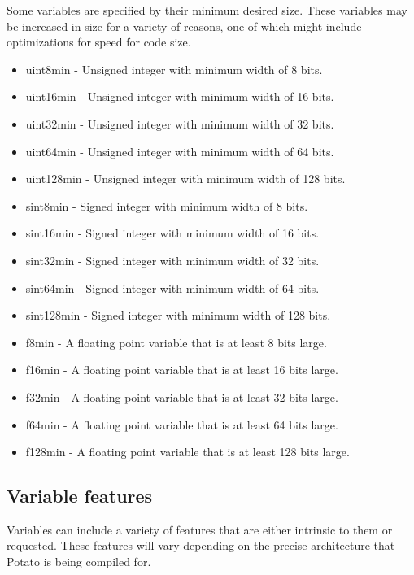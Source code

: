 \documentclass[12pt]{article}
\newcommand{\progLangNameSpace}{Potato }
\begin{document}
Some variables are specified by their minimum desired size. These variables may be increased in size for a variety of reasons, one of which might include optimizations for speed for code size.

\begin{itemize}
\item uint8min - Unsigned integer with minimum width of 8 bits.
\item uint16min - Unsigned integer with minimum width of 16 bits.
\item uint32min - Unsigned integer with minimum width of 32 bits.
\item uint64min - Unsigned integer with minimum width of 64 bits.
\item uint128min - Unsigned integer with minimum width of 128 bits.
\item sint8min - Signed integer with minimum width of 8 bits.
\item sint16min - Signed integer with minimum width of 16 bits.
\item sint32min - Signed integer with minimum width of 32 bits.
\item sint64min - Signed integer with minimum width of 64 bits.
\item sint128min - Signed integer with minimum width of 128 bits.
\item f8min - A floating point variable that is at least 8 bits large.
\item f16min - A floating point variable that is at least 16 bits large.
\item f32min - A floating point variable that is at least 32 bits large.
\item f64min - A floating point variable that is at least 64 bits large.
\item f128min - A floating point variable that is at least 128 bits large.
\end{itemize}

\subsection{Variable features}

Variables can include a variety of features that are either intrinsic to them or requested. These features will vary depending on the precise architecture that \progLangNameSpace is being compiled for.
\end{document}
